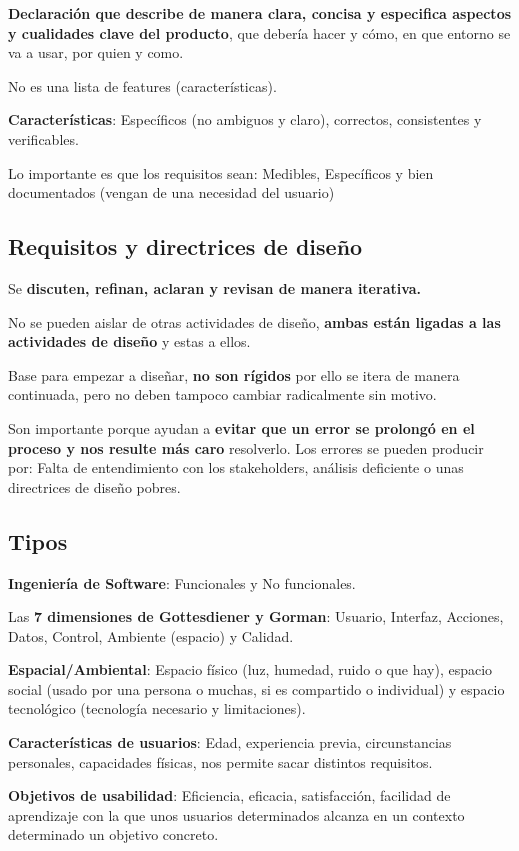 \documentclass[12pt]{report} %
\begin{document}
\textbf{Declaración que describe de manera clara, concisa y especifica
aspectos y cualidades clave del producto}, que debería hacer y cómo, en
que entorno se va a usar, por quien y como.

No es una lista de features (características).

\textbf{Características}: Específicos (no ambiguos y claro), correctos,
consistentes y verificables.

Lo importante es que los requisitos sean: Medibles, Específicos y bien documentados (vengan de una necesidad del usuario)

\subsection{Requisitos y directrices de diseño}

Se \textbf{discuten, refinan, aclaran y revisan de manera iterativa.}

No se pueden aislar de otras actividades de diseño, \textbf{ambas están
ligadas a las actividades de diseño} y estas a ellos.

Base para empezar a diseñar, \textbf{no son rígidos} por ello se itera
de manera continuada, pero no deben tampoco cambiar radicalmente sin
motivo.

Son importante porque ayudan a \textbf{evitar que un error se prolongó
en el proceso y nos resulte más caro} resolverlo. Los errores se pueden
producir por: Falta de entendimiento con los stakeholders, análisis
deficiente o unas directrices de diseño pobres.

\subsection{Tipos}

\textbf{Ingeniería de Software}: Funcionales y No funcionales.

Las \textbf{7 dimensiones de Gottesdiener y Gorman}: Usuario, Interfaz,
Acciones, Datos, Control, Ambiente (espacio) y Calidad.

\textbf{Espacial/Ambiental}: Espacio físico (luz, humedad, ruido o que
hay), espacio social (usado por una persona o muchas, si es compartido o
individual) y espacio tecnológico (tecnología necesario y limitaciones).

\textbf{Características de usuarios}: Edad, experiencia previa,
circunstancias personales, capacidades físicas, nos permite sacar
distintos requisitos.

\textbf{Objetivos de usabilidad}: Eficiencia, eficacia, satisfacción,
facilidad de aprendizaje con la que unos usuarios determinados alcanza en
un contexto determinado un objetivo concreto.
\end{document}
